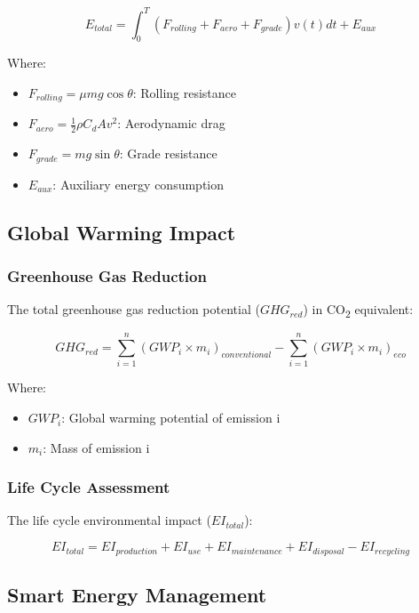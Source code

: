 \documentclass[12pt,a4paper]{article}
\begin{document}
\begin{equation}
E_{total} = \int_{0}^{T} (F_{rolling} + F_{aero} + F_{grade})v(t)dt + E_{aux}
\end{equation}

Where:
\begin{itemize}
    \item \(F_{rolling} = \mu mg\cos\theta\): Rolling resistance
    \item \(F_{aero} = \frac{1}{2}\rho C_dAv^2\): Aerodynamic drag
    \item \(F_{grade} = mg\sin\theta\): Grade resistance
    \item \(E_{aux}\): Auxiliary energy consumption
\end{itemize}

\subsection{Global Warming Impact}
\subsubsection{Greenhouse Gas Reduction}
The total greenhouse gas reduction potential (\(GHG_{red}\)) in CO\textsubscript{2} equivalent:

\begin{equation}
GHG_{red} = \sum_{i=1}^{n} (GWP_i \times m_i)_{conventional} - \sum_{i=1}^{n} (GWP_i \times m_i)_{eco}
\end{equation}

Where:
\begin{itemize}
    \item \(GWP_i\): Global warming potential of emission i
    \item \(m_i\): Mass of emission i
\end{itemize}

\subsubsection{Life Cycle Assessment}
The life cycle environmental impact (\(EI_{total}\)):

\begin{equation}
EI_{total} = EI_{production} + EI_{use} + EI_{maintenance} + EI_{disposal} - EI_{recycling}
\end{equation}

\subsection{Smart Energy Management}
\end{document}
